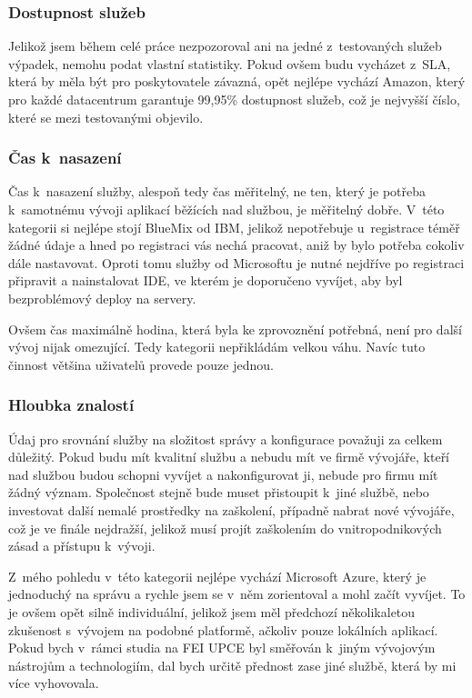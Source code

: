 \subsubsection{Dostupnost služeb}
Jelikož jsem během celé práce nezpozoroval ani na jedné z~testovaných služeb výpadek, nemohu podat vlastní statistiky. Pokud ovšem budu vycházet z~SLA, která by měla být pro poskytovatele závazná, opět nejlépe vychází Amazon, který pro každé datacentrum garantuje 99,95\% dostupnost služeb, což je nejvyšší číslo, které se mezi testovanými objevilo.

\subsubsection{Čas k~nasazení}
Čas k~nasazení služby, alespoň tedy čas měřitelný, ne ten, který je potřeba k~samotnému vývoji aplikací běžících nad službou, je měřitelný dobře. V~této kategorii si nejlépe stojí BlueMix od IBM, jelikož nepotřebuje u~registrace téměř žádné údaje a hned po registraci vás nechá pracovat, aniž by bylo potřeba cokoliv dále nastavovat. Oproti tomu služby od Microsoftu je nutné nejdříve po registraci připravit a nainstalovat IDE, ve kterém je doporučeno vyvíjet, aby byl bezproblémový deploy na servery.

Ovšem čas maximálně hodina, která byla ke zprovoznění potřebná, není pro další vývoj nijak omezující. Tedy kategorii nepřikládám velkou váhu. Navíc tuto činnost většina uživatelů provede pouze jednou.

\subsubsection{Hloubka znalostí}
Údaj pro srovnání služby na složitost správy a konfigurace považuji za celkem důležitý. Pokud budu mít kvalitní službu a nebudu mít ve firmě vývojáře, kteří nad službou budou schopni vyvíjet a nakonfigurovat ji, nebude pro firmu mít žádný význam. Společnost stejně bude muset přistoupit k~jiné službě, nebo investovat další nemalé prostředky na zaškolení, případně nabrat nové vývojáře, což je ve finále nejdražší, jelikož musí projít zaškolením do vnitropodnikových zásad a přístupu k~vývoji.

Z~mého pohledu v~této kategorii nejlépe vychází Microsoft Azure, který je jednoduchý na správu a rychle jsem se v~něm zorientoval a mohl začít vyvíjet. To je ovšem opět silně individuální, jelikož jsem měl předchozí několikaletou zkušenost s~vývojem na podobné platformě, ačkoliv pouze lokálních aplikací. Pokud bych v~rámci studia na FEI UPCE byl směřován k~jiným vývojovým nástrojům a technologiím, dal bych určitě přednost zase jiné službě, která by mi více vyhovovala.

